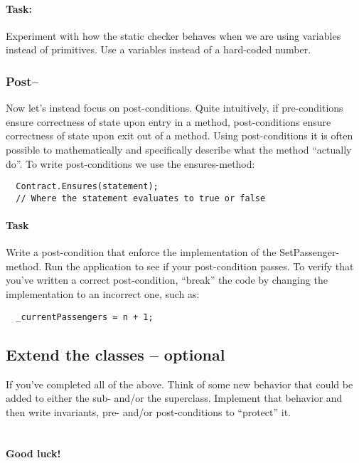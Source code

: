 \documentclass{article}
\begin{document}
      \paragraph{Task:}
      Experiment with how the static checker behaves when we are using variables instead of primitives. Use a variables instead of a hard-coded number.

    \subsubsection{Post--}
    Now let's instead focus on post-conditions. Quite intuitively, if pre-conditions ensure correctness of state upon entry in a method, post-conditions ensure correctness of state upon exit out of a method. Using post-conditions it is often possible to mathematically and specifically describe what the method ``actually do''. To write post-conditions we use the ensures-method:
    \begin{lstlisting}
  Contract.Ensures(statement);
  // Where the statement evaluates to true or false
    \end{lstlisting}
    \paragraph{Task} Write a post-condition that enforce the implementation of the SetPassenger-method. Run the application to see if your post-condition passes. To verify that you've written a correct post-condition, ``break'' the code by changing the implementation to an incorrect one, such as:
    \begin{lstlisting}
  _currentPassengers = n + 1;
    \end{lstlisting}

  \subsection{Extend the classes -- optional}
    If you've completed all of the above. Think of some new behavior that could be added to either the sub- and/or the superclass. Implement that behavior and then write invariants, pre- and/or post-conditions to ``protect'' it.

\section*{}
\paragraph{Good luck!}
\end{document}
